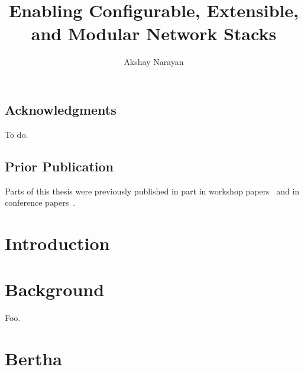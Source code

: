 \documentclass[fontsize=12pt,paper=letter,twosided,cleardoublepage=plain,final]{scrbook}
\title{Enabling Configurable, Extensible, and Modular Network Stacks}
\author{Akshay Narayan}
\begin{document}
\frontmatter



\cleardoublepage


\cleardoublepage

\section*{Acknowledgments}
\begin{spacing}{1}
%
    To do.
\end{spacing}
\cleardoublepage

\section*{Prior Publication}
Parts of this thesis were previously published in part in workshop papers~\cite{ccp, bertha} and in conference
papers~\cite{ccp, bundler, park}.
\cleardoublepage

\tableofcontents

\mainmatter

\chapter{Introduction}\label{s:intro}



\chapter{Background}\label{s:background}

Foo.

\chapter{Bertha}\label{s:bertha}


\afterpage{\FloatBarrier}
\afterpage{\clearpage}

\afterpage{\FloatBarrier}
\afterpage{\clearpage}

\afterpage{\FloatBarrier}
\afterpage{\clearpage}

\afterpage{\FloatBarrier}
\afterpage{\clearpage}

\afterpage{\FloatBarrier}
\afterpage{\clearpage}

\afterpage{\FloatBarrier}
\afterpage{\clearpage}
\end{document}
